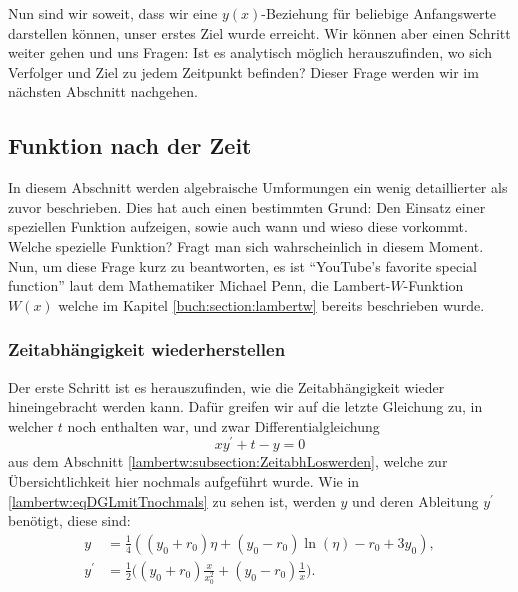 Nun sind wir soweit, dass wir eine \(y(x)\)-Beziehung für beliebige Anfangswerte darstellen können, unser erstes Ziel wurde erreicht. Wir können aber einen Schritt weiter gehen und uns Fragen: Ist es analytisch möglich herauszufinden, wo sich Verfolger und Ziel zu jedem Zeitpunkt befinden? Dieser Frage werden wir im nächsten Abschnitt nachgehen.

\subsection{Funktion nach der Zeit 
	\label{lambertw:subsection:FunkNachT}}
In diesem Abschnitt werden algebraische Umformungen ein wenig detaillierter als zuvor beschrieben. Dies hat auch einen bestimmten Grund: Den Einsatz einer speziellen Funktion aufzeigen, sowie auch wann und wieso diese vorkommt. Welche spezielle Funktion? Fragt man sich wahrscheinlich in diesem Moment. Nun, um diese Frage kurz zu beantworten, es ist ``YouTube's favorite special function'' laut dem Mathematiker Michael Penn, die Lambert-\(W\)-Funktion \(W(x)\) welche im Kapitel \ref{buch:section:lambertw} bereits beschrieben wurde.

\subsubsection{Zeitabhängigkeit wiederherstellen
	\label{lambertw:subsubsection:ZeitabhWiederherst}}
Der erste Schritt ist es herauszufinden, wie die Zeitabhängigkeit wieder hineingebracht werden kann. Dafür greifen wir auf die letzte Gleichung zu, in welcher \(t\) noch enthalten war, und zwar Differentialgleichung 
\begin{equation}
	x y^{\prime} + t - y
	= 0
	\label{lambertw:eqDGLmitTnochmals}
\end{equation}
aus dem Abschnitt \eqref{lambertw:subsection:ZeitabhLoswerden}, welche zur Übersichtlichkeit hier nochmals aufgeführt wurde.
Wie in \eqref{lambertw:eqDGLmitTnochmals} zu sehen ist, werden \(y\) und deren Ableitung \(y^{\prime}\) benötigt, diese sind:
\begin{subequations}
	\label{lambertw:eqFunkUndAbleit}
	\begin{align}
		\label{lambertw:eqFunkUndAbleit1}
		y
		&=
		\frac{1}{4}\left(\left(y_0+r_0\right)\eta+\left(y_0-r_0\right)\operatorname{ln}\left(\eta\right)-r_0+3y_0\right), \\
		y^\prime
		&=
		\frac{1}{2}\biggl(\left(y_0+r_0\right)\frac{x}{x_0^2}+\left(y_0-r_0\right)\frac{1}{x}\biggr).
	\end{align}
\end{subequations}

